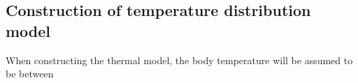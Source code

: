 \subsection{Construction of temperature distribution model}
When constructing the thermal model, the body temperature will be assumed to be between